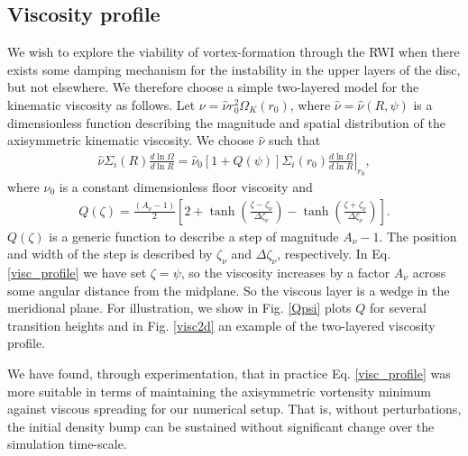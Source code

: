 \subsection{Viscosity profile}\label{visc_model}
We wish to explore the viability of vortex-formation through the RWI
when there exists some damping mechanism for the instability in the
upper layers of the disc, but not elsewhere. We therefore choose a
simple two-layered model for the kinematic viscosity as follows. Let
$\nu = \hat{\nu}r_0^2\Omega_K(r_0)$, where
$\hat{\nu}=\hat{\nu}(R,\psi)$ is a dimensionless function describing
the magnitude and spatial distribution of the axisymmetric kinematic
viscosity. We choose $\hat{\nu}$ such that   
\begin{align}\label{visc_profile}
  \hat{\nu}\Sigma_i(R)\frac{d\ln{\Omega}}{d\ln{R}} =
  \hat{\nu}_0\left[1+Q(\psi)\right]\Sigma_i(r_0)\left.\frac{d\ln{\Omega}}{d\ln{R}}\right|_{r_0}, 
\end{align}
where $\nu_0$ is a constant dimensionless floor viscosity and   
\begin{align}
  Q(\zeta) = \frac{\left(A_\nu - 1\right)}{2}
  \left[  2 + \tanh{\left(\frac{\zeta - \zeta_\nu}{\Delta\zeta_\nu}\right)}
  - \tanh{\left(\frac{\zeta +
        \zeta_\nu}{\Delta\zeta_\nu}\right)}\right]. 
\end{align}
$Q(\zeta)$ is a generic function to describe a step of magnitude
$A_\nu-1$. The position and width of the step is described by
$\zeta_\nu$ and $\Delta\zeta_\nu$, respectively. 
In Eq. \ref{visc_profile} we have set $\zeta=\psi$, 
so the viscosity increases by a factor $A_\nu$ across some angular
distance from the midplane. So the viscous layer is a wedge in the
meridional plane. For illustration, we show in Fig. \ref{Qpsi} plots $Q$ for several transition
heights and in  Fig. \ref{visc2d} an example of the two-layered
viscosity profile.

We have found, through experimentation, that in practice 
Eq. \ref{visc_profile} was more suitable in terms of maintaining the
axisymmetric vortensity minimum against viscous spreading for our
numerical setup. That is, without perturbations, the
initial density bump can be sustained without significant change 
over the simulation time-scale.  


